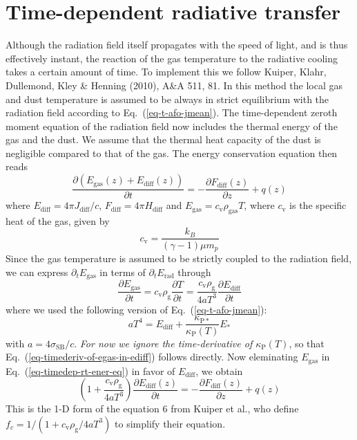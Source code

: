 \documentclass{book}
\begin{document}
\section{Time-dependent radiative transfer}
Although the radiation field itself propagates with the speed of light, and is
thus effectively instant, the reaction of the gas temperature to the radiative
cooling takes a certain amount of time. To implement this we follow Kuiper,
Klahr, Dullemond, Kley \& Henning (2010), A\&A 511, 81. In this method the local
gas and dust temperature is assumed to be always in strict equilibrium with the
radiation field according to Eq.~(\ref{eq-t-afo-jmean}). The time-dependent
zeroth moment equation of the radiation field now includes the thermal energy of
the gas and the dust. We assume that the thermal heat capacity of the dust is
negligible compared to that of the gas. The energy conservation equation
then reads
\begin{equation}\label{eq-timedep-rt-ener-eq}
  \frac{\partial(E_{\mathrm{gas}}(z)+E_{\mathrm{diff}}(z))}{\partial t}
  = -\frac{\partial F_{\mathrm{diff}}(z)}{\partial z} + q(z)
\end{equation}
where $E_{\mathrm{diff}}=4\pi J_{\mathrm{diff}}/c$, $F_{\mathrm{diff}}=4\pi
H_{\mathrm{diff}}$ and $E_{\mathrm{gas}}=c_{\mathrm{v}}\rho_{\mathrm{gas}}T$,
where $c_{\mathrm{v}}$ is the specific heat of the gas, given by
\begin{equation}
c_{\mathrm{v}}=\frac{k_B}{(\gamma-1)\mu m_p}
\end{equation}
Since the gas temperature is assumed to be strictly coupled to the
radiation field, we can express $\partial_t E_{\mathrm{gas}}$ in terms of
$\partial_t E_{\mathrm{rad}}$ through
\begin{equation}\label{eq-timederiv-of-egas-in-ediff}
  \frac{\partial E_{\mathrm{gas}}}{\partial t} = c_{\mathrm{v}}\rho_{\mathrm{g}}\frac{\partial T}{\partial t}
  =\frac{c_{\mathrm{v}}\rho_{\mathrm{g}}}{4aT^3}\frac{\partial E_{\mathrm{diff}}}{\partial t}
\end{equation}
where we used the following version of Eq.~(\ref{eq-t-afo-jmean}):
\begin{equation}
aT^4 = E_{\mathrm{diff}} + \frac{\kappa_{\mathrm{P*}}}{\kappa_{\mathrm{P}}(T)}E_{*}
\end{equation}
with $a=4\sigma_{\mathrm{SB}}/c$. {\em For now we ignore the time-derivative of
  $\kappa_{\mathrm{P}}(T)$}, so that Eq.~(\ref{eq-timederiv-of-egas-in-ediff})
follows directly. Now eleminating $E_{\mathrm{gas}}$ in Eq.~(\ref{eq-timedep-rt-ener-eq})
in favor of $E_{\mathrm{diff}}$, we obtain
\begin{equation}
\left(1+\frac{c_{\mathrm{v}}\rho_{\mathrm{g}}}{4aT^3}\right)
  \frac{\partial E_{\mathrm{diff}}(z)}{\partial t}
  = -\frac{\partial F_{\mathrm{diff}}(z)}{\partial z} + q(z)
\end{equation}
This is the 1-D form of the equation 6 from Kuiper et al., who define
$f_c=1/(1+c_{\mathrm{v}}\rho_{\mathrm{g}}/4aT^3)$ to simplify their equation.
\end{document}
